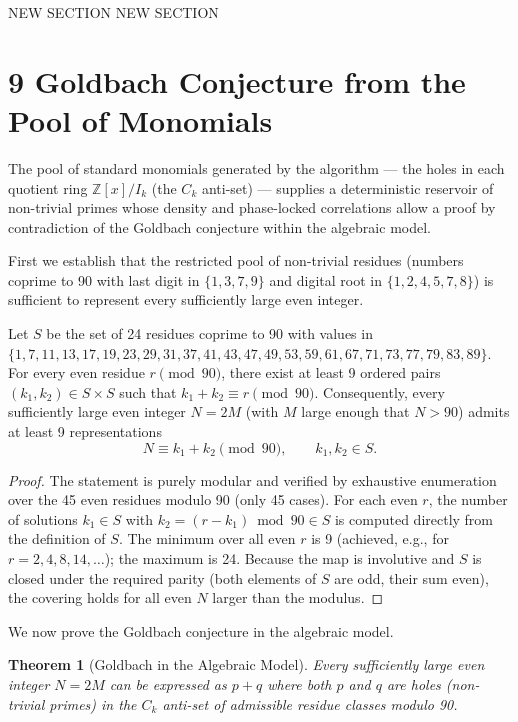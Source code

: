 \documentclass[11pt,a4paper]{article}
\newtheorem{theorem}{Theorem} %
\begin{document}
NEW SECTION NEW SECTION 

\section{9 Goldbach Conjecture from the Pool of Monomials}

The pool of standard monomials generated by the algorithm — the holes in each quotient ring \(\mathbb{Z}[x]/I_k\) (the \(C_k\) anti-set) — supplies a deterministic reservoir of non-trivial primes whose density and phase-locked correlations allow a proof by contradiction of the Goldbach conjecture within the algebraic model.

First we establish that the restricted pool of non-trivial residues (numbers coprime to 90 with last digit in \(\{1,3,7,9\}\) and digital root in \(\{1,2,4,5,7,8\}\)) is sufficient to represent every sufficiently large even integer.

\begin{lemma}
Let \(S\) be the set of 24 residues coprime to 90 with values in \(\{1,7,11,13,17,19,23,29,31,37,41,43,47,49,53,59,61,67,71,73,77,79,83,89\}\). For every even residue \(r\pmod{90}\), there exist at least 9 ordered pairs \((k_1,k_2)\in S\times S\) such that \(k_1+k_2\equiv r\pmod{90}\). Consequently, every sufficiently large even integer \(N=2M\) (with \(M\) large enough that \(N>90\)) admits at least 9 representations
\[
N\equiv k_1+k_2\pmod{90},\qquad k_1,k_2\in S.
\]
\end{lemma}

\begin{proof}
The statement is purely modular and verified by exhaustive enumeration over the 45 even residues modulo 90 (only 45 cases). For each even \(r\), the number of solutions \(k_1\in S\) with \(k_2=(r-k_1)\bmod 90\in S\) is computed directly from the definition of \(S\). The minimum over all even \(r\) is 9 (achieved, e.g., for \(r=2,4,8,14,\dots\)); the maximum is 24. Because the map is involutive and \(S\) is closed under the required parity (both elements of \(S\) are odd, their sum even), the covering holds for all even \(N\) larger than the modulus.
\end{proof}

We now prove the Goldbach conjecture in the algebraic model.

\begin{theorem}[Goldbach in the Algebraic Model]
Every sufficiently large even integer \(N=2M\) can be expressed as \(p+q\) where both \(p\) and \(q\) are holes (non-trivial primes) in the \(C_k\) anti-set of admissible residue classes modulo 90.
\end{theorem}
\end{document}
